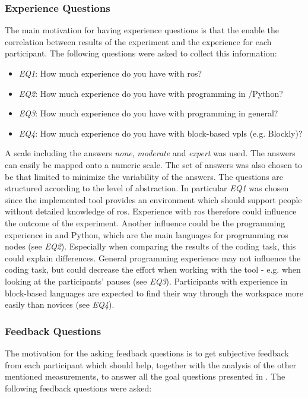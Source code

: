 \subsubsection*{Experience Questions}
The main motivation for having experience questions is that the enable the correlation between results of the experiment and the experience for each participant. The following questions were asked to collect this information:

\begin{itemize}
    \item \textit{EQ1}: How much experience do you have with \gls{ros}?
    \item \textit{EQ2}: How much experience do you have with programming in \Cpp{}/Python?
    \item \textit{EQ3}: How much experience do you have with programming in general?
    \item \textit{EQ4}: How much experience do you have with block-based \glspl{vpl} (e.g. Blockly)?
\end{itemize}
A scale including the answers \textit{none}, \textit{moderate} and \textit{expert} was used. The answers can easily be mapped onto a numeric scale. The set of answers was also chosen to be that limited to minimize the variability of the answers. The questions are structured according to the level of abstraction. In particular \textit{EQ1} was chosen since the implemented tool provides an environment which should support people without detailed knowledge of \gls{ros}. Experience with \gls{ros} therefore could influence the outcome of the experiment. Another influence could be the programming experience in \Cpp{} and Python, which are the main languages for programming \gls{ros} nodes (see \textit{EQ2}). Especially when comparing the results of the coding task, this could explain differences. General programming experience may not influence the coding task, but could decrease the effort when working with the tool - e.g. when looking at the participants' pauses (see \textit{EQ3}). Participants with experience in block-based languages are expected to find their way through the \toolname{} workspace more easily than novices (see \textit{EQ4}).

\subsubsection*{Feedback Questions}
The motivation for the asking feedback questions is to get subjective feedback from each participant which should help, together with the analysis of the other mentioned measurements, to answer all the goal questions presented in . The following feedback questions were asked:

